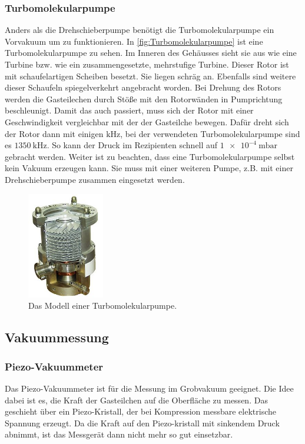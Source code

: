        \subsubsection{Turbomolekularpumpe}
            Anders als die Drehschieberpumpe benötigt die Turbomolekularpumpe ein Vorvakuum um zu funktionieren.
            In \autoref{fig:Turbomolekularpumpe} ist eine Turbomolekularpumpe zu sehen.
            Im Inneren des Gehäusses sieht sie aus wie eine Turbine bzw. wie ein zusammengesetzte, mehrstufige Turbine.
            Dieser Rotor ist mit schaufelartigen Scheiben besetzt.
            Sie liegen schräg an.
            Ebenfalls sind weitere dieser Schaufeln spiegelverkehrt angebracht worden.
            Bei Drehung des Rotors werden die Gasteilechen durch Stöße mit den Rotorwänden in Pumprichtung beschleunigt.
            Damit das auch passiert, muss sich der Rotor mit einer Geschwindigkeit vergleichbar mit der der Gasteilche bewegen.
            Dafür dreht sich der Rotor dann mit einigen $\si{\kilo\hertz}$, bei der verwendeten Turbomolekularpumpe sind es $\SI{1350}{\kilo\hertz}$.
            So kann der Druck im Rezipienten schnell auf $\SI{1e-4}{\milli\bar}$ gebracht werden.
            Weiter ist zu beachten, dass eine Turbomolekularpumpe selbst kein Vakuum erzeugen kann. 
            Sie muss mit einer weiteren Pumpe, z.B. mit einer Drehschieberpumpe zusammen eingesetzt werden.

        \begin{figure}[H]
            \centering
            \includegraphics[width=0.3\textwidth]{bilder/Turbomolekularpumpe}
            \caption{Das Modell einer Turbomolekularpumpe.\cite{turboBild}}
            \label{fig:Turbomolekularpumpe}
        \end{figure}

    \subsection{Vakuummessung}
        \subsubsection{Piezo-Vakuummeter}
            Das Piezo-Vakuummeter ist für die Messung im Grobvakuum geeignet.
            Die Idee dabei ist es, die Kraft der Gasteilchen auf die Oberfläche zu messen.
            Das geschieht über ein Piezo-Kristall, der bei Kompression messbare elektrische Spannung erzeugt.
            Da die Kraft auf den Piezo-kristall mit sinkendem Druck abnimmt, ist das Messgerät dann nicht mehr so gut einsetzbar.

